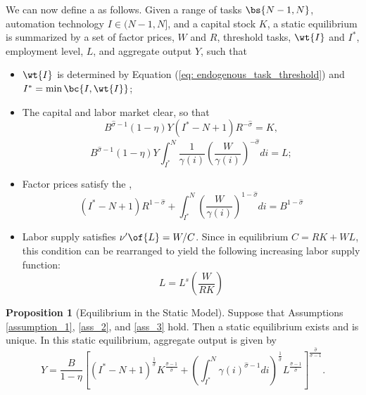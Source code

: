 \documentclass[12pt]{article}
\newcommand{\highlightB}[1]{{\emph{\color{MyBlue}{#1}}}}
\theoremstyle{definition}
\newtheorem{proposition}{Proposition}
\begin{document}
We can now define a \highlightB{static equilibrium} as follows. Given a range of tasks $\bs{N-1, N}$, automation technology $I \in (N-1, N]$, and a capital stock $K$, a static equilibrium is summarized by a set of factor prices, $W$ and $R$, threshold tasks, $\wt{I}$ and $I^*$, employment level, $L$, and aggregate output $Y$, such that 
\begin{itemize}[topsep=0pt, leftmargin=20pt, itemsep=0pt]
\setlength{\parskip}{10pt} 
\item $\wt{I}$ is determined by Equation (\ref{eq: endogenous_task_threshold}) and $I^* = \min \bc{I, \wt{I}}$;

\item The capital and labor market clear, so that 
\begin{equation}
    \label{eq: capital_market_clear}
    B^{\widehat{\sigma}-1}(1-\eta) Y\left(I^*-N+1\right) R^{-\widehat{\sigma}}=K ,
\end{equation}
\begin{equation}
    \label{eq: labor_market_clear}
    B^{\widehat{\sigma}-1}(1-\eta) Y \int_{I^*}^N \frac{1}{\gamma(i)}\left(\frac{W}{\gamma(i)}\right)^{-\widehat{\sigma}} d i=L ;
\end{equation}

\item Factor prices satisfy the \highlightB{ideal price index condition},
\begin{equation}
    \label{eq: ideal_price_index_condition}
    \left(I^*-N+1\right) R^{1-\widehat{\sigma}}+\int_{I^*}^N\left(\frac{W}{\gamma(i)}\right)^{1-\widehat{\sigma}} d i=B^{1-\widehat{\sigma}}
\end{equation}

\item Labor supply satisfies $\nu^\prime\of{L} = W / C$. Since in equilibrium $C = RK + WL$, this condition can be rearranged to yield the following increasing labor supply function:
\begin{equation}
    \label{eq: labor_supply_function}
    L=L^s\left(\frac{W}{R K}\right)
\end{equation}
\end{itemize}

\begin{proposition}[Equilibrium in the Static Model]
    \label{prop_1}
    Suppose that Assumptions \ref{assumption_1}, \ref{ass_2}, and \ref{ass_3} hold. Then a static equilibrium exists and is unique. In this static equilibrium, aggregate output is given by 
    \begin{equation}
        \label{eq: aggregate_output}
        Y=\frac{B}{1-\eta}\left[\left(I^*-N+1\right)^{\frac{1}{\sigma}} K^{\frac{\hat{\sigma}-1}{\hat{\sigma}}}+\left(\int_{I^*}^N \gamma(i)^{\hat{\sigma}-1} d i\right)^{\frac{1}{\hat{\sigma}}} L^{\frac{\hat{\sigma}-1}{\hat{\sigma}}}\right]^{\frac{\widehat{\sigma}}{\hat{\sigma}-1}} .
    \end{equation}
\end{proposition}
\end{document}
